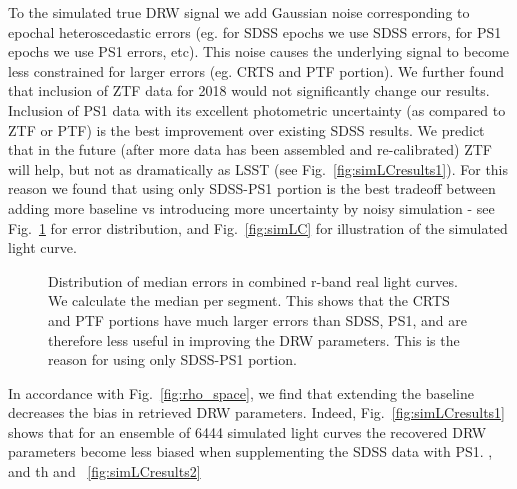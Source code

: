\documentclass[twocolumn]{aastex62}
\begin{document}
To the simulated true DRW signal we add Gaussian noise corresponding to epochal heteroscedastic errors (eg. for SDSS epochs we use SDSS errors, for PS1 epochs we use PS1 errors, etc). This noise causes the underlying signal to become less constrained for larger errors (eg. CRTS  and PTF portion).  We further found that inclusion of ZTF data for 2018 would not significantly change our results. Inclusion of PS1 data with its excellent photometric uncertainty (as compared to ZTF or PTF) is the best improvement over existing SDSS results.  We predict that in the future (after more data has been assembled and re-calibrated) ZTF will help, but not as dramatically as LSST (see Fig.~\ref{fig:simLCresults1}).  For this reason we found that using only SDSS-PS1 portion is the best tradeoff between adding more baseline vs introducing more uncertainty by noisy simulation  - see Fig.~\ref{fig:combinedLCerrors} for error distribution, and Fig.~\ref{fig:simLC} for illustration of  the simulated light curve. 

\begin{figure}%
\caption{Distribution of median errors in combined r-band real light curves. We calculate the median per segment. This shows that the CRTS and PTF portions have much larger errors than SDSS, PS1, and are therefore less useful in improving the DRW parameters. This is the reason for using only SDSS-PS1 portion.  }
\label{fig:combinedLCerrors}
\end{figure} 


In accordance with Fig.~\ref{fig:rho_space}, we find that extending the baseline decreases the bias in retrieved DRW parameters. Indeed, Fig.~\ref{fig:simLCresults1} shows that for an ensemble of 6444 simulated light curves the  recovered DRW parameters become less biased when supplementing the SDSS data with PS1. , and th and ~\ref{fig:simLCresults2} 

\begin{figure*}
\caption{Retrieved $\tau$ and $\sigma$  parameters for simulated LCs. }
\label{fig:simLCresults1}
\end{figure*} 

\begin{figure*}
\caption{Comparison of retrieved parameters in relation to input parameters, shown as Fig.18 in \citet{macleod2011} }
\label{fig:simLCresults2}
\end{figure*} 
\end{document}
